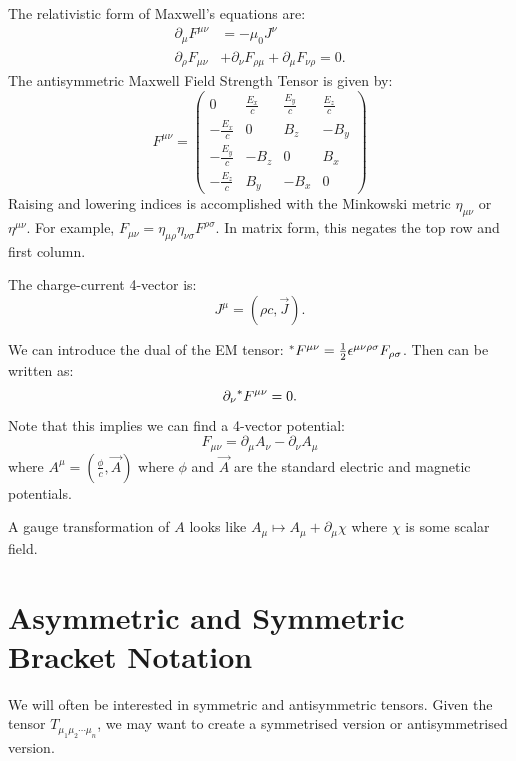 \documentclass[../Main.tex]{subfiles}
\begin{document}
The relativistic form of Maxwell's equations are:
\begin{align}
    \partial_\mu F^{\mu \nu} &= -\mu_0 J^\nu \label{eqnMaxForced} \\
    \partial_\rho F_{\mu \nu} &+ \partial_\nu F_{\rho \mu} + \partial_\mu F_{\nu \rho} = 0 \label{eqnMaxASym}.
\end{align}
The antisymmetric Maxwell Field Strength Tensor is given by:
\begin{equation*}
    F^{\mu \nu} =
    \begin{pmatrix}
        0 & \frac{E_x}{c} & \frac{E_y}{c} & \frac{E_z}{c} \\
        -\frac{E_x}{c} & 0 & B_z & -B_y \\
        -\frac{E_y}{c} & -B_z & 0 & B_x \\
        -\frac{E_z}{c} & B_y & -B_x & 0
    \end{pmatrix}
\end{equation*}
Raising and lowering indices is accomplished with the Minkowski metric $\eta_{\mu \nu}$ or $\eta^{\mu \nu}$. For example, $F_{\mu \nu} = \eta_{\mu \rho} \eta_{\nu \sigma} F^{\rho \sigma}$. In matrix form, this negates the top row and first column.

The charge-current 4-vector is:
\begin{equation*}
    J^\mu = (\rho c, \vec{J}).
\end{equation*}

We can introduce the dual of the EM tensor: ${}^*F^{\mu \nu} = \frac12 \epsilon^{\mu \nu \rho \sigma} F_{\rho\sigma}$. Then  can be written as:
\begin{equation}
    \partial_\nu {}^*F^{\mu \nu} = 0.
    \label{eqnMaxDiv}
\end{equation}
Note that this implies we can find a 4-vector potential:
\begin{equation}
    F_{\mu \nu} = \partial_\mu A_\nu - \partial_\nu A_\mu
    \label{eqn4VecPot}
\end{equation}
where $A^\mu = \left(\frac{\phi}{c}, \vec{A}\right)$ where $\phi$ and $\vec{A}$ are the standard electric and magnetic potentials.

A gauge transformation of $A$ looks like $A_\mu \mapsto A_\mu + \partial_\mu \chi$ where $\chi$ is some scalar field.
\section{Asymmetric and Symmetric Bracket Notation}
We will often be interested in symmetric and antisymmetric tensors. Given the tensor $T_{\mu_1 \mu_2 \cdots \mu_n}$, we may want to create a symmetrised version or antisymmetrised version.
\end{document}
